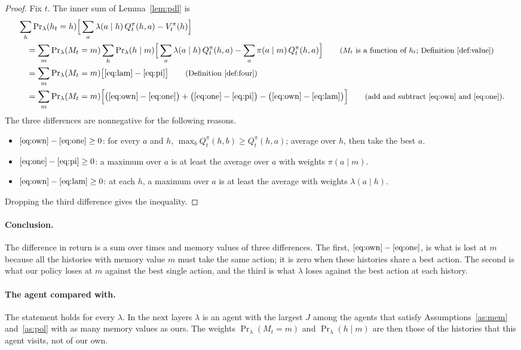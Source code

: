 \documentclass{article}
\theoremstyle{definition}
\numberwithin{equation}{section}
\newcommand{\Prl}{\Pr\nolimits_{\lambda}}
\newcommand{\why}[1]{\tag*{\small(#1)}}
\begin{document}
\begin{proof}
Fix $t$. The inner sum of Lemma~\ref{lem:pdl} is
\begin{align*}
&\sum_h\Prl (h_t=h)\Big[\sum_a\lambda(a\mid h)\,Q^\pi_t(h,a)-V^\pi_t(h)\Big]\\
&\quad=\sum_m\Prl (M_t=m)\sum_h\Prl (h\mid m)\Big[\sum_a\lambda(a\mid h)\,Q^\pi_t(h,a)-\sum_a\pi(a\mid m)\,Q^\pi_t(h,a)\Big] \why{$M_t$ is a function of $h_t$; Definition~\ref{def:value}}\\
&\quad=\sum_m\Prl (M_t=m)\big[\eqref{eq:lam}-\eqref{eq:pi}\big] \why{Definition~\ref{def:four}}\\
&\quad=\sum_m\Prl (M_t=m)\Big[\big(\eqref{eq:own}-\eqref{eq:one}\big)+\big(\eqref{eq:one}-\eqref{eq:pi}\big)-\big(\eqref{eq:own}-\eqref{eq:lam}\big)\Big] \why{add and subtract \eqref{eq:own} and \eqref{eq:one}}.
\end{align*}
The three differences are nonnegative for the following reasons.
\begin{itemize}
\item $\eqref{eq:own}-\eqref{eq:one}\ge0$: for every $a$ and $h$, $\max_bQ^\pi_t(h,b)\ge Q^\pi_t(h,a)$; average over $h$, then take the best $a$.
\item $\eqref{eq:one}-\eqref{eq:pi}\ge0$: a maximum over $a$ is at least the average over $a$ with weights $\pi(a\mid m)$.
\item $\eqref{eq:own}-\eqref{eq:lam}\ge0$: at each $h$, a maximum over $a$ is at least the average with weights $\lambda(a\mid h)$.
\end{itemize}
Dropping the third difference gives the inequality.
\end{proof}

\paragraph{Conclusion.} The difference in return is a sum over times and memory values of three differences. The first, $\eqref{eq:own}-\eqref{eq:one}$, is what is lost at $m$ because all the histories with memory value $m$ must take the same action; it is zero when these histories share a best action. The second is what our policy loses at $m$ against the best single action, and the third is what $\lambda$ loses against the best action at each history.

\paragraph{The agent compared with.} The statement holds for every $\lambda$. In the next layers $\lambda$ is an agent with the largest $J$ among the agents that satisfy Assumptions~\ref{as:mem} and~\ref{as:pol} with as many memory values as ours. The weights $\Prl(M_t=m)$ and $\Prl(h\mid m)$ are then those of the histories that this agent visits, not of our own.
\end{document}
